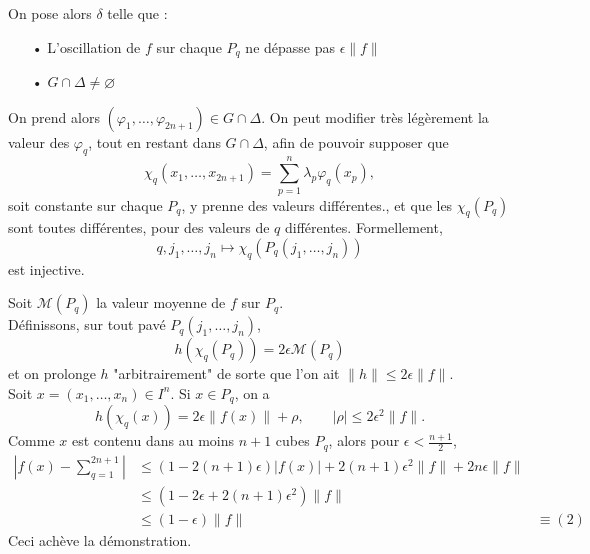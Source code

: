 \documentclass[a4paper]{article}
\begin{document}
On pose alors $\delta$ telle que : 
\begin{itemize}
\item[•] L'oscillation de $f$ sur chaque $P_q$ ne dépasse pas $\epsilon \|f\|$
\item[•] $G \cap \Delta \neq \varnothing$\\
\end{itemize}

On prend alors $(\varphi_1,…, \varphi_{2n+1}) \in G \cap \Delta$. On peut modifier très légèrement la valeur des $\varphi_q$, tout en restant dans $G \cap \Delta$, afin de pouvoir supposer que \[\chi_q(x_1,…, x_{2n+1}) = \sum_{p=1}^n \lambda_p \varphi_q (x_p), \]soit constante sur chaque $P_q$, y prenne des valeurs différentes., et que les $\chi_q(P_q)$ sont toutes différentes, pour des valeurs de $q$ différentes. Formellement, \[q,j_1,…, j_n \mapsto \chi_q(P_q(j_1,…, j_n)) \] est injective.

Soit $\mathcal{M}(P_q)$ la valeur moyenne de $f$ sur $P_q$.\\
Définissons, sur tout pavé $P_q(j_1,…,j_n)$, \[h(\chi_q(P_q))=2\epsilon \mathcal{M}(P_q)\]
et on prolonge $h$ "arbitrairement" de sorte que l'on ait $ \|h\| \leqslant 2\epsilon\|f\|$.\\
Soit $x = (x_1,…,x_n) \in I^n$. Si $x \in P_q$, on a \[h(\chi_q(x))=2\epsilon\|f(x)\| + \rho, \qquad |\rho|\leqslant 2\epsilon^2\|f\| .\]
Comme $x$ est contenu dans au moins $n+1$ cubes $P_q$, alors pour $\epsilon < \frac{n+1}{2}$,
\begin{align*}
|f(x) - \sum_{q=1}^{2n+1}| & \leqslant (1-2(n+1)\epsilon)|f(x)| + 2(n+1)\epsilon^2\|f\|+2n\epsilon \|f\|\\
& \leqslant (1-2\epsilon + 2(n+1)\epsilon^2)\|f\| \\
& \leqslant(1-\epsilon)\|f\| & \equiv (2)
\end{align*}
Ceci achève la démonstration.
\end{document}
